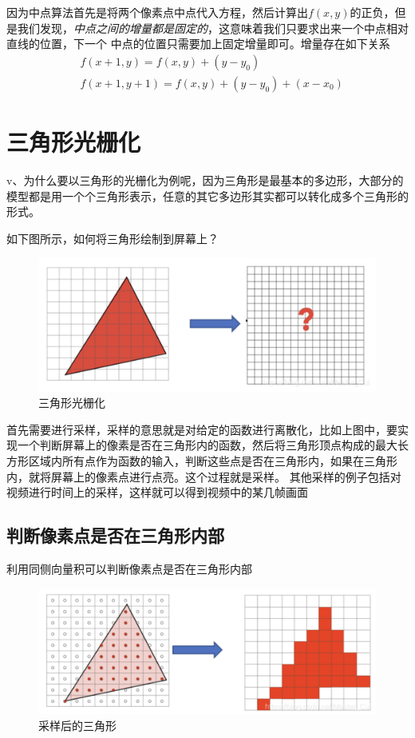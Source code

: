 因为中点算法首先是将两个像素点中点代入方程，然后计算出$f(x,y)$的正负，但是我们发现，\textsl{中点之间的增量都是固定的}，这意味着我们只要求出来一个中点相对直线的位置，下一个
中点的位置只需要加上固定增量即可。增量存在如下关系
\begin{equation}
    \begin{aligned}
        & f(x+1,y)=f(x,y)+(y-y_0) \\
        & f(x+1,y+1)=f(x,y)+(y-y_0)+(x-x_0)
    \end{aligned}
\end{equation}

\section{三角形光栅化}

v、为什么要以三角形的光栅化为例呢，因为三角形是最基本的多边形，大部分的模型都是用一个个三角形表示，任意的其它多边形其实都可以转化成多个三角形的形式。

如下图所示，如何将三角形绘制到屏幕上？

\begin{figure}[H]
    \centering
    \includegraphics[scale=0.2]{figures/三角形光栅化.png}
    \caption{三角形光栅化}
\end{figure}

首先需要进行采样，采样的意思就是对给定的函数进行离散化，比如上图中，要实现一个判断屏幕上的像素是否在三角形内的函数，然后将三角形顶点构成的最大长方形区域内所有点作为函数的输入，判断这些点是否在三角形内，如果在三角形内，就将屏幕上的像素点进行点亮。这个过程就是采样。
其他采样的例子包括对视频进行时间上的采样，这样就可以得到视频中的某几帧画面

\subsection*{判断像素点是否在三角形内部}

利用同侧向量积可以判断像素点是否在三角形内部

\begin{figure}[H]
    \centering
    \includegraphics[scale=0.2]{figures/采样后的三角形.png}
    \caption{采样后的三角形}
\end{figure}

